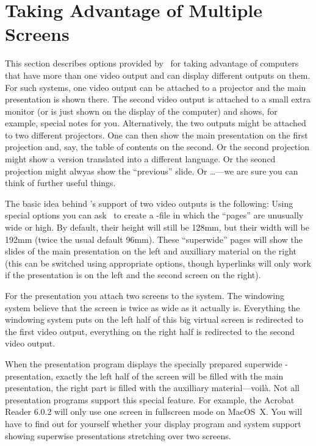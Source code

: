 %
%
%


\section{Taking Advantage of Multiple Screens}
\label{section-twoscreens}

This section describes options provided by \beamer\ for taking advantage of computers that have more than one video output and can display different outputs on them. For such systems, one video output can be attached to a projector and the main presentation is shown there. The second video output is attached to a small extra monitor (or is just shown on the display of the computer) and shows, for example, special notes for you. Alternatively, the two outputs might be attached to two different projectors. One can then show the main presentation on the first projection and, say, the table of contents on the second. Or the second projection might show a version translated into a different language. Or the seoncd projection might alwyas show the ``previous'' slide. Or \ldots---we are sure you can think of further useful things.

The basic idea behind \beamer's support of two video outputs is the following: Using special options you can ask \beamer\ to create a \pdf-file in which the ``pages'' are unusually wide or high. By default, their height will still be 128mm, but their width will be 192mm (twice the usual default 96mm). These ``superwide'' pages will show the slides of the main presentation on the left and auxilliary material on the right (this can be switched using appropriate options, though hyperlinks will only work if the presentation is on the left and the second screen on the right).

For the presentation you attach two screens to the system. The windowing system believe that the screen is twice as wide as it actually is. Everything the windowing system puts on the left half of this big virtual screen is redirected to the first video output, everything on the right half is redirected to the second video output.

When the presentation program displays the specially prepared superwide \beamer-presentation, exactly the left half of the screen will be filled with the main presentation, the right part is filled with the auxilliary material---voil\`a. Not all presentation programs support this special feature. For example, the Acrobat Reader 6.0.2 will only use one screen in fullscreen mode on MacOS~X. You will have to find out for yourself whether your display program and system support showing superwise presentations stretching over two screens.

